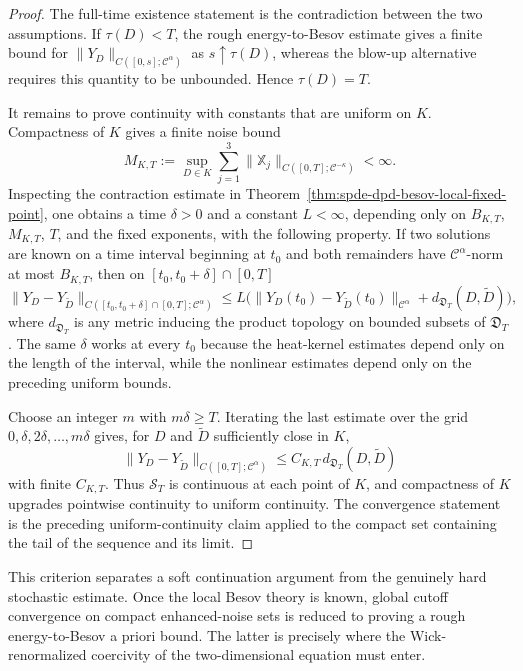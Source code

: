 \begin{proof}
The full-time existence statement is the contradiction between the two
assumptions.  If \(\tau(D)<T\), the rough energy-to-Besov estimate gives a
finite bound for
\(\|Y_D\|_{C([0,s];\mathcal C^\alpha)}\) as \(s\uparrow\tau(D)\), whereas
the blow-up alternative requires this quantity to be unbounded.  Hence
\(\tau(D)=T\).

It remains to prove continuity with constants that are uniform on \(K\).
Compactness of \(K\) gives a finite noise bound
\[
  M_{K,T}:=
  \sup_{D\in K}\sum_{j=1}^3
  \|\mathbb X_j\|_{C([0,T];\mathcal C^{-\kappa})}
  <\infty .
\]
Inspecting the contraction estimate in
Theorem~\ref{thm:spde-dpd-besov-local-fixed-point}, one obtains a time
\(\delta>0\) and a constant \(L<\infty\), depending only on
\(B_{K,T}\), \(M_{K,T}\), \(T\), and the fixed exponents, with the following
property.  If two solutions are known on a time interval beginning at
\(t_0\) and both remainders have \(\mathcal C^\alpha\)-norm at most
\(B_{K,T}\), then on
\([t_0,t_0+\delta]\cap[0,T]\)
\[
  \|Y_D-Y_{\widetilde D}\|_
  {C([t_0,t_0+\delta]\cap[0,T];\mathcal C^\alpha)}
  \leq
  L\Big(
    \|Y_D(t_0)-Y_{\widetilde D}(t_0)\|_{\mathcal C^\alpha}
    + d_{\mathfrak D_T}(D,\widetilde D)
  \Big),
\]
where \(d_{\mathfrak D_T}\) is any metric inducing the product topology on
bounded subsets of \(\mathfrak D_T\).  The same \(\delta\) works at every
\(t_0\) because the heat-kernel estimates depend only on the length of the
interval, while the nonlinear estimates depend only on the preceding
uniform bounds.

Choose an integer \(m\) with \(m\delta\geq T\).  Iterating the last estimate
over the grid \(0,\delta,2\delta,\ldots,m\delta\) gives, for \(D\) and
\(\widetilde D\) sufficiently close in \(K\),
\[
  \|Y_D-Y_{\widetilde D}\|_{C([0,T];\mathcal C^\alpha)}
  \leq C_{K,T}\,d_{\mathfrak D_T}(D,\widetilde D)
\]
with finite \(C_{K,T}\).  Thus \(\mathcal S_T\) is continuous at each point
of \(K\), and compactness of \(K\) upgrades pointwise continuity to uniform
continuity.  The convergence statement is the preceding uniform-continuity
claim applied to the compact set containing the tail of the sequence and
its limit.
\end{proof}

This criterion separates a soft continuation argument from the genuinely
hard stochastic estimate.  Once the local Besov theory is known, global
cutoff convergence on compact enhanced-noise sets is reduced to proving a
rough energy-to-Besov a priori bound.  The latter is precisely where the
Wick-renormalized coercivity of the two-dimensional equation must enter.

